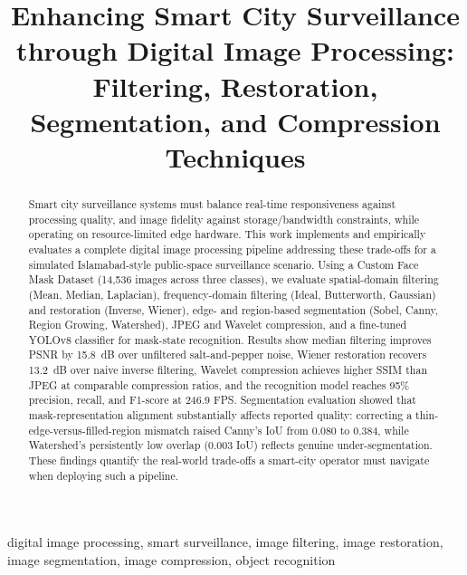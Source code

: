 \documentclass[conference]{IEEEtran}
\begin{document}
\title{Enhancing Smart City Surveillance through Digital Image Processing: Filtering, Restoration, Segmentation, and Compression Techniques}

\author{
}

\maketitle

\begin{abstract}
Smart city surveillance systems must balance real-time responsiveness against processing quality, and image fidelity against storage/bandwidth constraints, while operating on resource-limited edge hardware. This work implements and empirically evaluates a complete digital image processing pipeline addressing these trade-offs for a simulated Islamabad-style public-space surveillance scenario. Using a Custom Face Mask Dataset (14{,}536 images across three classes), we evaluate spatial-domain filtering (Mean, Median, Laplacian), frequency-domain filtering (Ideal, Butterworth, Gaussian) and restoration (Inverse, Wiener), edge- and region-based segmentation (Sobel, Canny, Region Growing, Watershed), JPEG and Wavelet compression, and a fine-tuned YOLOv8 classifier for mask-state recognition. Results show median filtering improves PSNR by 15.8~dB over unfiltered salt-and-pepper noise, Wiener restoration recovers 13.2~dB over naive inverse filtering, Wavelet compression achieves higher SSIM than JPEG at comparable compression ratios, and the recognition model reaches 95\% precision, recall, and F1-score at 246.9 FPS. Segmentation evaluation showed that mask-representation alignment substantially affects reported quality: correcting a thin-edge-versus-filled-region mismatch raised Canny's IoU from 0.080 to 0.384, while Watershed's persistently low overlap (0.003 IoU) reflects genuine under-segmentation. These findings quantify the real-world trade-offs a smart-city operator must navigate when deploying such a pipeline.
\end{abstract}

\begin{IEEEkeywords}
digital image processing, smart surveillance, image filtering, image restoration, image segmentation, image compression, object recognition
\end{IEEEkeywords}
\end{document}
